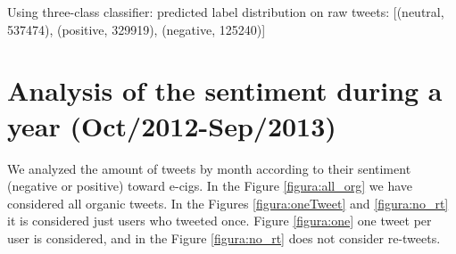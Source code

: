 \documentclass{sig-alternate}
\begin{document}
Using three-class classifier: predicted label distribution on raw tweets: [(neutral, 537474), (positive, 329919), (negative, 125240)]


\section{Analysis of the sentiment during a year (Oct/2012-Sep/2013)}

We analyzed the amount of tweets by month according to their sentiment (negative or positive) toward e-cigs. In the Figure \ref{figura:all_org} we have considered all organic tweets. In the Figures \ref{figura:oneTweet} and \ref{figura:no_rt} it is considered just users who tweeted once. Figure \ref{figura:one} one tweet per user is considered, and in the Figure \ref{figura:no_rt} does not consider re-tweets.

\end{document}
